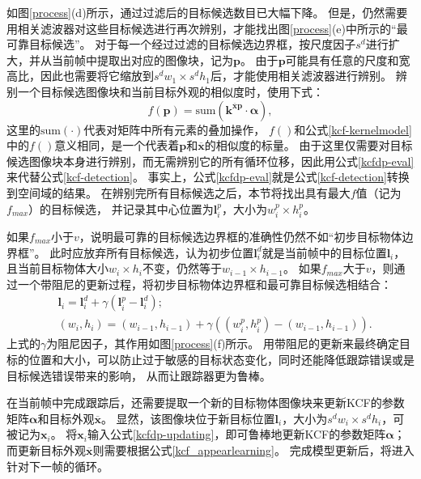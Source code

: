 如图\ref{process}(d)所示，通过过滤后的目标候选数目已大幅下降。
但是，仍然需要用相关滤波器对这些目标候选进行再次辨别，才能找出图\ref{process}(e)中所示的``最可靠目标候选''。
对于每一个经过过滤的目标候选边界框，按尺度因子$s^d$进行扩大，并从当前帧中提取出对应的图像块，记为$\mathbf{p}$。
由于$\mathbf{p}$可能具有任意的尺度和宽高比，因此也需要将它缩放到$s^dw_1\times s^dh_1$后，才能使用相关滤波器进行辨别。
辨别一个目标候选图像块和当前目标外观的相似度时，使用下式：
\begin{equation}
	f(\mathbf{p})=\text{sum}(\mathbf{k}^{\overline{\mathbf{x}}\mathbf{p}}\cdot{\boldsymbol{\alpha}}),\label{kcfdp-eval}
\end{equation}
这里的$\text{sum}(\cdot)$代表对矩阵中所有元素的叠加操作，
$f()$和公式\ref{kcf-kernelmodel}中的$f()$意义相同，是一个代表着$\mathbf{p}$和$\overline{\mathbf{x}}$的相似度的标量。
由于这里仅需要对目标候选图像块本身进行辨别，而无需辨别它的所有循环位移，因此用公式\ref{kcfdp-eval}来代替公式\ref{kcf-detection}。
事实上，公式\ref{kcfdp-eval}就是公式\ref{kcf-detection}转换到空间域的结果。
在辨别完所有目标候选之后，本节将找出具有最大$f$值（记为$f_{max}$）的目标候选，
并记录其中心位置为$\mathbf{l}^{p}_i$，大小为$w^p_i\times h^p_i$。

如果$f_{max}$小于$v$，说明最可靠的目标候选边界框的准确性仍然不如``初步目标物体边界框''。
此时应放弃所有目标候选，认为初步位置$\mathbf{l}^d_i$就是当前帧中的目标位置$\mathbf{l}_i$，
且当前目标物体大小$w_i\times h_i$不变，仍然等于$w_{i-1}\times h_{i-1}$。
如果$f_{max}$大于$v$，则通过一个带阻尼的更新过程，将初步目标物体边界框和最可靠目标候选相结合：
\begin{equation}
\begin{aligned}
	&\mathbf{l}_i=\mathbf{l}^d_i+\gamma(\mathbf{l}^p_i-\mathbf{l}^d_i);\\ 
	&(w_i, h_i)=(w_{i-1},h_{i-1})+\gamma((w^p_i, h^p_i)-(w_{i-1},h_{i-1})). \label{kcfdp-damping}
\end{aligned}
\end{equation}
上式的$\gamma$为阻尼因子，其作用如图\ref{process}(f)所示。
用带阻尼的更新来最终确定目标的位置和大小，可以防止过于敏感的目标状态变化，同时还能降低跟踪错误或是目标候选错误带来的影响，
从而让跟踪器更为鲁棒。

在当前帧中完成跟踪后，还需要提取一个新的目标物体图像块来更新KCF的参数矩阵$\boldsymbol{\alpha}$和目标外观$\overline{\mathbf{x}}$。
显然，该图像块位于新目标位置$\mathbf{l}_i$，大小为$s^dw_i\times s^dh_i$，可被记为$\mathbf{x}_i$。
将$\mathbf{x}_i$输入公式\ref{kcfdp-updating}，即可鲁棒地更新KCF的参数矩阵$\boldsymbol{\alpha}$；
而更新目标外观$\overline{\mathbf{x}}$则需要根据公式\ref{kcf_appearlearning}。
完成模型更新后，将进入针对下一帧的循环。

